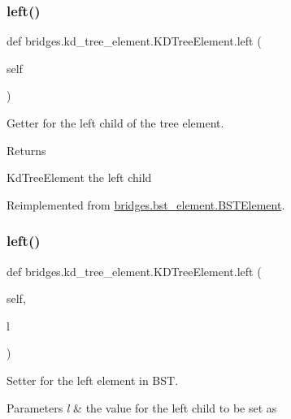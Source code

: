 \subsubsection{\texorpdfstring{left()}{left()}\hspace{0.1cm}{\footnotesize\ttfamily [1/2]}}
{\footnotesize\ttfamily def bridges.\+kd\+\_\+tree\+\_\+element.\+K\+D\+Tree\+Element.\+left (\begin{DoxyParamCaption}\item[{}]{self }\end{DoxyParamCaption})}



Getter for the left child of the tree element. 

\begin{DoxyReturn}{Returns}


Kd\+Tree\+Element the left child 
\end{DoxyReturn}


Reimplemented from \mbox{\hyperlink{classbridges_1_1bst__element_1_1_b_s_t_element_adb40ae0f98fe1cb7f153494c544d3f9f}{bridges.\+bst\+\_\+element.\+B\+S\+T\+Element}}.

\mbox{\label{classbridges_1_1kd__tree__element_1_1_k_d_tree_element_a784bad6511dae3a7c769672d2d3af14f}} 
\subsubsection{\texorpdfstring{left()}{left()}\hspace{0.1cm}{\footnotesize\ttfamily [2/2]}}
{\footnotesize\ttfamily def bridges.\+kd\+\_\+tree\+\_\+element.\+K\+D\+Tree\+Element.\+left (\begin{DoxyParamCaption}\item[{}]{self,  }\item[{}]{l }\end{DoxyParamCaption})}



Setter for the left element in B\+ST. 


\begin{DoxyParams}{Parameters}
{\em l} & the value for the left child to be set as \\
\hline
\end{DoxyParams}


